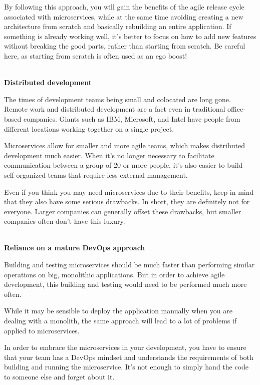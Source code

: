 By following this approach, you will gain the benefits of the agile release cycle associated with microservices, while at the same time avoiding creating a new architecture from scratch and basically rebuilding an entire application. If something is already working well, it's better to focus on how to add new features without breaking the good parts, rather than starting from scratch. Be careful here, as starting from scratch is often used as an ego boost!

\hspace*{\fill} \\ %
\noindent
\textbf{Distributed development}

The times of development teams being small and colocated are long gone. Remote work and distributed development are a fact even in traditional office-based companies. Giants such as IBM, Microsoft, and Intel have people from different locations working together on a single project.

Microservices allow for smaller and more agile teams, which makes distributed development much easier. When it's no longer necessary to facilitate communication between a group of 20 or more people, it's also easier to build self-organized teams that require less external management.


Even if you think you may need microservices due to their benefits, keep in mind that they also have some serious drawbacks. In short, they are definitely not for everyone. Larger companies can generally offset these drawbacks, but smaller companies often don't have this luxury.

\hspace*{\fill} \\ %
\noindent
\textbf{Reliance on a mature DevOps approach}

Building and testing microservices should be much faster than performing similar operations on big, monolithic applications. But in order to achieve agile development, this building and testing would need to be performed much more often. 

While it may be sensible to deploy the application manually when you are dealing with a monolith, the same approach will lead to a lot of problems if applied to microservices.

In order to embrace the microservices in your development, you have to ensure that your team has a DevOps mindset and understands the requirements of both building and running the microservice. It's not enough to simply hand the code to someone else and forget about it.

